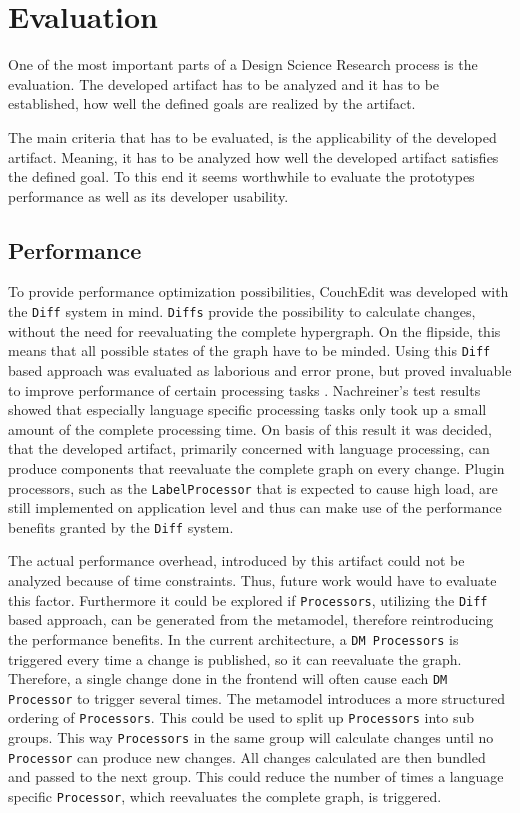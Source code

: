\chapter{Evaluation}
\label{chap:evaluation}
One of the most important parts of a Design Science Research process is the evaluation. The developed artifact has to be analyzed and it has to be established, how well the defined goals are realized by the artifact.

The main criteria that has to be evaluated, is the applicability of the developed artifact. Meaning, it has to be analyzed how well the developed artifact satisfies the defined goal. To this end it seems worthwhile to evaluate the prototypes performance as well as its developer usability. 

\section{Performance}
To provide performance optimization possibilities, CouchEdit was developed with the \texttt{Diff} system in mind. \texttt{Diffs} provide the possibility to calculate changes, without the need for reevaluating the complete hypergraph. On the flipside, this means that all possible states of the graph have to be minded. Using this \texttt{Diff} based approach was evaluated as laborious and error prone, but proved invaluable to improve performance of certain processing tasks \cite{nachreiner_couchedit_2020}. Nachreiner's test results showed that especially language specific processing tasks only took up a small amount of the complete processing time. On basis of this result it was decided, that the developed artifact, primarily concerned with language processing, can produce components that reevaluate the complete graph on every change. Plugin processors, such as the \texttt{LabelProcessor} that is expected to cause high load, are still implemented on application level and thus can make use of the performance benefits granted by the \texttt{Diff} system. 

The actual performance overhead, introduced by this artifact could not be analyzed because of time constraints. Thus, future work would have to evaluate this factor. Furthermore it could be explored if \texttt{Processors}, utilizing the \texttt{Diff} based approach, can be generated from the metamodel, therefore reintroducing the performance benefits. In the current architecture, a \texttt{DM Processors} is triggered every time a change is published, so it can reevaluate the graph. Therefore, a single change done in the frontend will often cause each \texttt{DM Processor} to trigger several times. The metamodel introduces a more structured ordering of \texttt{Processors}. This could be used to split up \texttt{Processors} into sub groups. This way \texttt{Processors} in the same group will calculate changes until no \texttt{Processor} can produce new changes. All changes calculated are then bundled and passed to the next group. This could reduce the number of times a language specific \texttt{Processor}, which reevaluates the complete graph, is triggered.  

